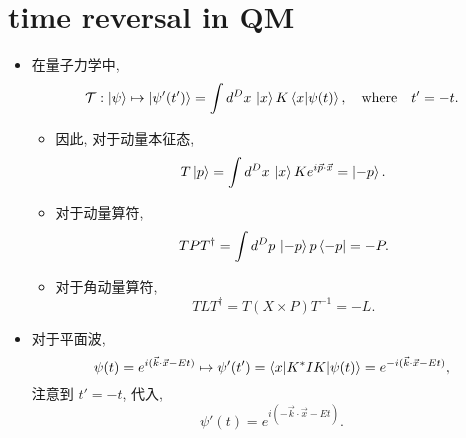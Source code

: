 \section{time reversal in QM}
\begin{itemize}
	\item 在量子力学中,
	\begin{equation}
		\mathcal{T} : \ket{\psi} \mapsto \ket{\psi'(t')} = \int d^D x \, \ket{x} K \braket{x | \psi(t)}, \quad \text{where} \quad t' = - t.
	\end{equation}
	\begin{itemize}
		\item 因此, 对于动量本征态,
		\begin{equation}
			T \ket{p} = \int d^D x \, \ket{x} K e^{i \vec{p} \cdot \vec{x}} = \ket{- p}.
		\end{equation}
		
		\item 对于动量算符,
		\begin{equation}
			T P T^\dag = \int d^D p \, \ket{- p} p \bra{- p} = - P.
		\end{equation}
		
		\item 对于角动量算符,
		\begin{equation}
			T L T^\dag = T (X \times P) T^{- 1} = - L.
		\end{equation}
	\end{itemize}
	
	\item 对于平面波,
	\begin{equation}
		\psi(t) = e^{i (\vec{k} \cdot \vec{x} - E t)} \mapsto \psi'(t') = \braket{x | K^* I K | \psi(t)} = e^{- i (\vec{k} \cdot \vec{x} - E t)},
	\end{equation}
	注意到 $t' = - t$, 代入,
	\begin{equation}
		\psi'(t) = e^{i (- \vec{k} \cdot \vec{x} - E t)}.
	\end{equation}
\end{itemize}


